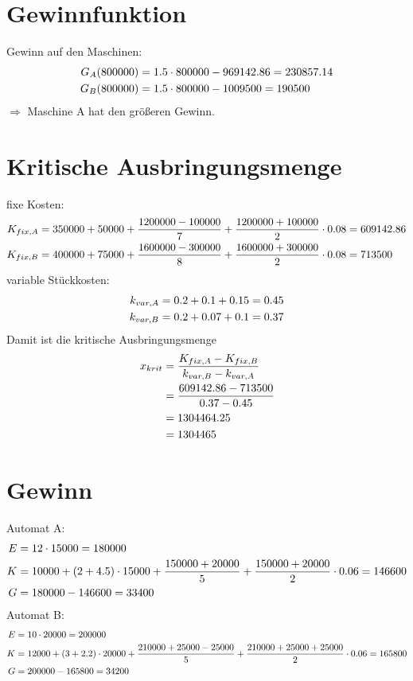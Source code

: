 \documentclass{article}
\begin{document}
	\section*{Gewinnfunktion}
	Gewinn auf den Maschinen:
	\begin{align}
		G_A(800000) &= 1.5\cdot 800000 - 969142.86 = 230857.14 \notag \\
		G_B(800000) &= 1.5\cdot 800000 - 1009500 = 190500 \notag
	\end{align}
	$\Rightarrow$ Maschine A hat den größeren Gewinn.
	
	\section*{Kritische Ausbringungsmenge}
	fixe Kosten:
	\begin{align}
		K_{fix,A} &= 350000 + 50000 + \frac{1200000 - 100000}{7} + \frac{1200000+100000}{2}\cdot 0.08 = 609142.86 \notag \\
		K_{fix,B} &= 400000 + 75000 + \frac{1600000 - 300000}{8} + \frac{1600000+300000}{2}\cdot 0.08 = 713500 \notag
	\end{align}
	variable Stückkosten:
	\begin{align}
		k_{var,A} &= 0.2 + 0.1 + 0.15 = 0.45 \notag \\
		k_{var,B} &= 0.2 + 0.07 + 0.1 = 0.37 \notag
	\end{align}
	Damit ist die kritische Ausbringungsmenge
	\begin{align}
		x_{krit} &= \frac{K_{fix,A} - K_{fix,B}}{k_{var,B} - k_{var,A}} \notag \\
		&= \frac{609142.86 - 713500}{0.37 - 0.45} \notag \\
		&= 1304464.25 \notag \\
		&= 1304465 \notag
	\end{align}
	
	\section*{Gewinn}
	Automat A:
	\begin{align}
		E &= 12\cdot 15000 = 180000 \notag \\
		K &= 10000 + (2 + 4.5)\cdot 15000 + \frac{150000 + 20000}{5} + \frac{150000 + 20000}{2}\cdot 0.06 = 146600 \notag \\
		G &= 180000 - 146600 = 33400 \notag
	\end{align}
	Automat B:
	\begin{align}
		E &= 10\cdot 20000 = 200000 \notag \\
		K &= 12000 + (3 + 2.2)\cdot 20000 + \frac{210000 + 25000 - 25000}{5} + \frac{210000 + 25000 + 25000}{2}\cdot 0.06 = 165800 \notag \\
		G &= 200000 - 165800 = 34200 \notag
	\end{align}
	
\end{document}
